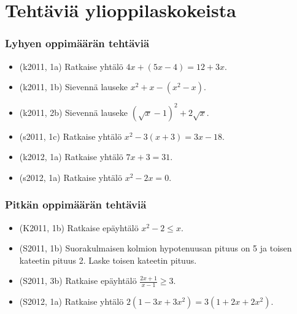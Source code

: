 \chapter{Tehtäviä ylioppilaskokeista}

\subsection*{Lyhyen oppimäärän tehtäviä}

\begin{itemize}
  \item[] (k2011, 1a) Ratkaise yhtälö $4x+(5x-4) = 12+3x$.
  \item[] (k2011, 1b) Sievennä lauseke $x^2+x-(x^2-x)$.
  \item[] (k2011, 2b) Sievennä lauseke $(\sqrt{x}-1)^2+2\sqrt{x}$.
  \item[] (s2011, 1c) Ratkaise yhtälö $x^2-3(x+3) = 3x-18$.
  \item[] (k2012, 1a) Ratkaise yhtälö $7x+3 = 31$.
  \item[] (s2012, 1a) Ratkaise yhtälö $x^2-2x = 0$.
\end{itemize}

\subsection*{Pitkän oppimäärän tehtäviä}

\begin{itemize}
  \item[] (K2011, 1b) Ratkaise epäyhtälö $x^2-2 \leq x$.
  \item[] (S2011, 1b) Suorakulmaisen kolmion hypotenuusan pituus on 5
   ja toisen kateetin pituus 2. Laske toisen kateetin pituus.
  \item[] (S2011, 3b) Ratkaise epäyhtälö $\frac{2x+1}{x-1} \geq 3$.
  \item[] (S2012, 1a) Ratkaise yhtälö $2(1-3x+3x^2) = 3(1+2x+2x^2)$.
\end{itemize}




